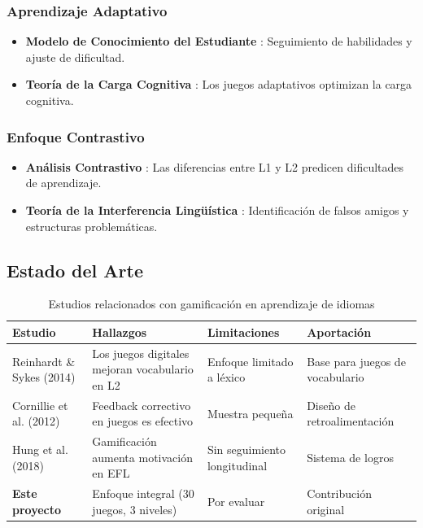\documentclass[12pt,a4paper]{article}
\begin{document}
\subsubsection{Aprendizaje Adaptativo}

\begin{itemize}
    \item \textbf{Modelo de Conocimiento del Estudiante} \cite{corbett1995}: Seguimiento de habilidades y ajuste de dificultad.
    
    \item \textbf{Teoría de la Carga Cognitiva} \cite{sweller1988}: Los juegos adaptativos optimizan la carga cognitiva.
\end{itemize}

\subsubsection{Enfoque Contrastivo}

\begin{itemize}
    \item \textbf{Análisis Contrastivo} \cite{lado1957}: Las diferencias entre L1 y L2 predicen dificultades de aprendizaje.
    \item \textbf{Teoría de la Interferencia Lingüística} \cite{weinreich1953}: Identificación de falsos amigos y estructuras problemáticas.
\end{itemize}

\subsection{Estado del Arte}

\begin{table}[H]
\centering
\caption{Estudios relacionados con gamificación en aprendizaje de idiomas}
\begin{tabular}{|p{3cm}|p{3cm}|p{3cm}|p{3cm}|}
\hline
\textbf{Estudio} & \textbf{Hallazgos} & \textbf{Limitaciones} & \textbf{Aportación} \\
\hline
Reinhardt \& Sykes (2014) & Los juegos digitales mejoran vocabulario en L2 & Enfoque limitado a léxico & Base para juegos de vocabulario \\
\hline
Cornillie et al. (2012) & Feedback correctivo en juegos es efectivo & Muestra pequeña & Diseño de retroalimentación \\
\hline
Hung et al. (2018) & Gamificación aumenta motivación en EFL & Sin seguimiento longitudinal & Sistema de logros \\
\hline
\textbf{Este proyecto} & Enfoque integral (30 juegos, 3 niveles) & Por evaluar & Contribución original \\
\hline
\end{tabular}
\end{table}
\end{document}
